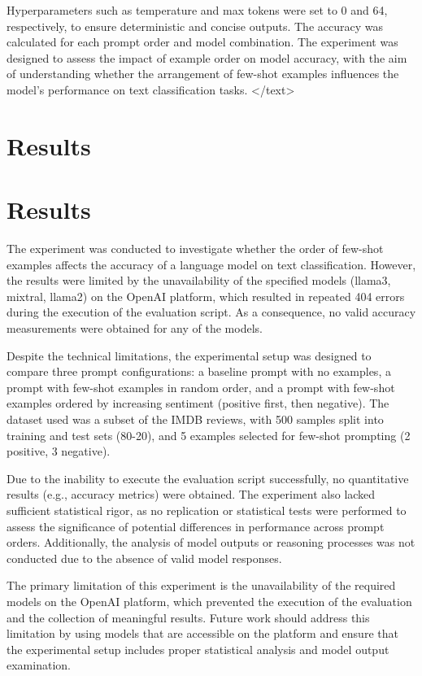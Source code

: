 \documentclass{article}
\begin{document}
Hyperparameters such as temperature and max tokens were set to 0 and 64, respectively, to ensure deterministic and concise outputs. The accuracy was calculated for each prompt order and model combination. The experiment was designed to assess the impact of example order on model accuracy, with the aim of understanding whether the arrangement of few-shot examples influences the model's performance on text classification tasks.
</text>
\section{Results}
\section{Results}

The experiment was conducted to investigate whether the order of few-shot examples affects the accuracy of a language model on text classification. However, the results were limited by the unavailability of the specified models (llama3, mixtral, llama2) on the OpenAI platform, which resulted in repeated 404 errors during the execution of the evaluation script. As a consequence, no valid accuracy measurements were obtained for any of the models.

Despite the technical limitations, the experimental setup was designed to compare three prompt configurations: a baseline prompt with no examples, a prompt with few-shot examples in random order, and a prompt with few-shot examples ordered by increasing sentiment (positive first, then negative). The dataset used was a subset of the IMDB reviews, with 500 samples split into training and test sets (80-20), and 5 examples selected for few-shot prompting (2 positive, 3 negative).

Due to the inability to execute the evaluation script successfully, no quantitative results (e.g., accuracy metrics) were obtained. The experiment also lacked sufficient statistical rigor, as no replication or statistical tests were performed to assess the significance of potential differences in performance across prompt orders. Additionally, the analysis of model outputs or reasoning processes was not conducted due to the absence of valid model responses.

The primary limitation of this experiment is the unavailability of the required models on the OpenAI platform, which prevented the execution of the evaluation and the collection of meaningful results. Future work should address this limitation by using models that are accessible on the platform and ensure that the experimental setup includes proper statistical analysis and model output examination.
\end{document}
